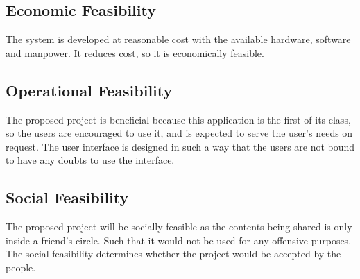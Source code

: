 \documentclass[12pt,a4paper,oneside]{report}
\begin{document}
{\subsection {Economic Feasibility}
\par The system is developed at reasonable cost with the available hardware, software and
manpower. It reduces cost, so it is economically feasible.
\subsection{Operational Feasibility}
\par The proposed project is beneficial because this application is the first of its class, so
the users are encouraged to use it, and is expected to serve the user's needs on request. The
user interface is designed in such a way that the users are not bound to have any doubts to use
the interface.
\subsection {Social Feasibility}
\par The proposed project will be socially feasible as the contents being shared is only inside a
friend's circle. Such that it would not be used for any offensive purposes. The social feasibility
determines whether the project would be accepted by the people.
}
\end{document}
